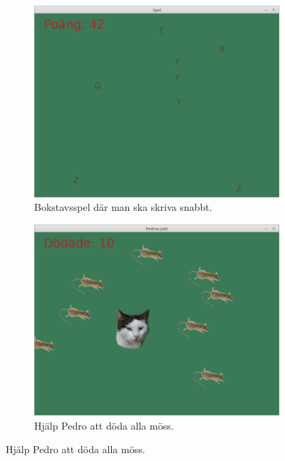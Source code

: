 \documentclass[a4paper,12pt]{article}
\begin{document}
\begin{figure}[!ht]
\centering
\begin{subfigure}{.4\textwidth}
  \centering
  \includegraphics[width=\textwidth]{bokstavsspel}
  \caption{Bokstavsspel där man ska skriva snabbt.}
\end{subfigure}\quad%
\begin{subfigure}{.4\textwidth}
  \centering
\includegraphics[width=\textwidth]{pedrospel}
\caption{Hjälp Pedro att döda alla möss.}
\end{subfigure}
\end{figure}
\end{document}
